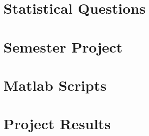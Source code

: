 \documentclass[11pt,a4paper]{report}
\begin{document}
\tableofcontents

\chapter{Statistical Questions}


\chapter{Semester Project}










\begin{appendices}
\chapter{Matlab Scripts}

\chapter{Project Results}

\end{appendices}
\end{document}
